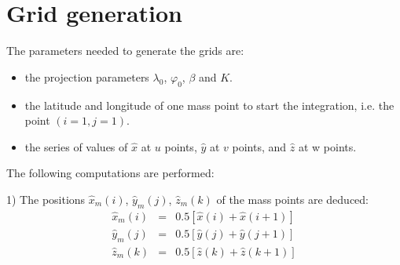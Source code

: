 \section{Grid generation}

The parameters needed to generate the grids are:
\begin{itemize}
\item the projection parameters $\lambda_{0}$, $\varphi_{0}$, $\beta$ and $K$.
\item the latitude and longitude of one mass point to start the integration,
i.e. the point $(i=1,j=1)$.
\item the series of values of $\widehat{x}$ at $u$ points, $\widehat{y}$
at $v$ points, and $\widehat{z}$ at w points.
\end{itemize}

The following computations are performed:

1) The positions $\widehat{x}_m(i)$, $\widehat{y}_m(j)$, $\widehat{z}_m(k)$
of the mass points are deduced:
\begin{eqnarray}
\widehat{x}_m(i) & = &0.5 \left[ \widehat{x}(i) +\widehat{x}(i+1) \right]
\nonumber \\
\widehat{y}_m(j) & = &0.5 \left[ \widehat{y}(j) +\widehat{y}(j+1) \right] \\
\widehat{z}_m(k) & = &0.5 \left[ \widehat{z}(k) +\widehat{z}(k+1) \right]
\nonumber
\end{eqnarray}

